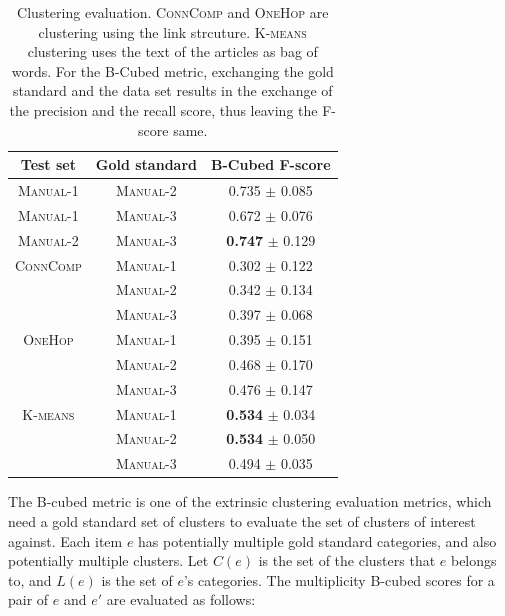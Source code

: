 \documentclass[11pt]{article}
\begin{document}
\begin{table}
\centering
\begin{tabular}{ccc}
Test set & Gold standard & B-Cubed F-score \\
\hline
\textsc{Manual-1} & \textsc{Manual-2} & 0.735 $\pm$ {\small 0.085} \\
\textsc{Manual-1} & \textsc{Manual-3} & 0.672 $\pm$ {\small 0.076} \\
\textsc{Manual-2} & \textsc{Manual-3} & \textbf{0.747} $\pm$ {\small 0.129} \\
\hline
\hline
\textsc{ConnComp} & \textsc{Manual-1} & 0.302 $\pm$ {\small 0.122} \\
& \textsc{Manual-2} & 0.342 $\pm$ {\small 0.134} \\
& \textsc{Manual-3} & 0.397 $\pm$ {\small 0.068} \\
\hline
\textsc{OneHop} & \textsc{Manual-1} & 0.395 $\pm$ {\small 0.151} \\
& \textsc{Manual-2} & 0.468 $\pm$ {\small 0.170} \\
& \textsc{Manual-3} & 0.476 $\pm$ {\small 0.147} \\
\hline
\textsc{K-means}& \textsc{Manual-1} & \textbf{0.534} $\pm$ {\small 0.034} \\
& \textsc{Manual-2} & \textbf{0.534} $\pm$ {\small 0.050} \\
& \textsc{Manual-3} & 0.494 $\pm$ {\small 0.035} \\
\hline
\end{tabular}

\caption{Clustering evaluation. \textsc{ConnComp} and \textsc{OneHop} are clustering using the link strcuture.
\textsc{K-means} clustering uses the text of the articles as bag of words.
For the B-Cubed metric, exchanging the gold standard and the data set results
in the exchange of the precision and the recall score, thus leaving the F-score same.}
\label{tab:clustering-results}
\end{table}

The B-cubed metric is one of the extrinsic clustering evaluation metrics, which need a gold standard set of clusters to evaluate the set of clusters of interest against.
Each item $e$ has potentially multiple gold standard categories, and also potentially multiple clusters.
Let $C(e)$ is the set of the clusters that $e$ belongs to, and $L(e)$ is the set of $e$'s categories.
The multiplicity B-cubed scores for a pair of $e$ and $e'$ are evaluated as follows:
\end{document}
